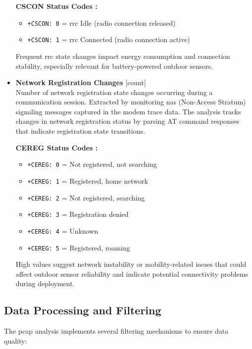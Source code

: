 \documentclass[12pt, english, openany]{book}
\begin{document}
\begin{itemize}
          \textbf{CSCON Status Codes \parencite{CSCON_STATUS_CODES}:}
          \begin{itemize}
              \item \texttt{+CSCON: 0} = \gls{rrc} Idle (radio connection released)
              \item \texttt{+CSCON: 1} = \gls{rrc} Connected (radio connection active)
          \end{itemize}

          Frequent \gls{rrc} state changes impact energy consumption and connection stability, especially relevant for battery-powered outdoor sensors.

    \item \textbf{Network Registration Changes} \hfill [count] \\
          Number of network registration state changes occurring during a communication session. Extracted by monitoring \gls{nas} (Non-Access Stratum) signaling messages captured in the modem trace data. The analysis tracks changes in network registration status by parsing AT command responses that indicate registration state transitions.

          \textbf{CEREG Status Codes \parencite{CREG_STATUS_CODES}:}
          \begin{itemize}
              \item \texttt{+CEREG: 0} = Not registered, not searching
              \item \texttt{+CEREG: 1} = Registered, home network
              \item \texttt{+CEREG: 2} = Not registered, searching
              \item \texttt{+CEREG: 3} = Registration denied
              \item \texttt{+CEREG: 4} = Unknown
              \item \texttt{+CEREG: 5} = Registered, roaming
          \end{itemize}

          High values suggest network instability or mobility-related issues that could affect outdoor sensor reliability and indicate potential connectivity problems during deployment.
\end{itemize}

\subsection*{Data Processing and Filtering}

The \gls{pcap} analysis implements several filtering mechanisms to ensure data quality:
\end{document}

